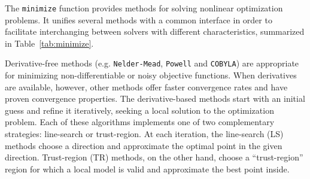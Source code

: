 The \texttt{minimize} function provides methods for solving nonlinear optimization
problems. It unifies several methods with a common interface in order to facilitate
interchanging between solvers with different characteristics, summarized in Table~\ref{tab:minimize}.

Derivative-free methods (e.g. \texttt{Nelder-Mead}, \texttt{Powell} and \texttt{COBYLA}) are appropriate for minimizing non-differentiable or
noisy objective functions. When derivatives are available, however, other methods offer faster convergence rates
and have proven convergence properties. 
The derivative-based methods start with an initial guess and refine it iteratively, seeking
a local solution to the optimization problem. Each of these algorithms implements one of two complementary strategies:
line-search or trust-region. At each iteration, the line-search (LS) methods choose a direction
and approximate the optimal point in the given direction. Trust-region (TR) methods, on the other
hand, choose a ``trust-region'' region for which a local model is valid and approximate the best point
inside.


